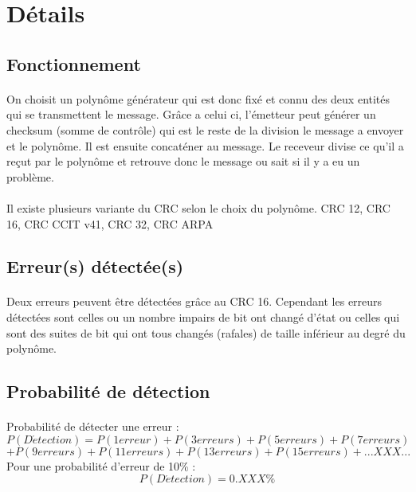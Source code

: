 \documentclass[a4paper,10pt]{report}
\begin{document}
            \section{Détails}
                \subsection{Fonctionnement}
                    \paragraph{}
                        On choisit un polynôme générateur qui est donc fixé et connu des deux entités qui se transmettent le message.
                        Grâce a celui ci, l'émetteur peut générer un checksum (somme de contrôle) qui est le reste
                        de la division le message a envoyer et le polynôme. Il est ensuite concaténer au message.
                        Le receveur divise ce qu'il a reçut par le polynôme et retrouve donc le message ou
                        sait si il y a eu un problème.
                    \paragraph{}
                        Il existe plusieurs variante du CRC selon le choix du polynôme.
                        CRC 12, CRC 16, CRC CCIT v41, CRC 32, CRC ARPA
                \subsection{Erreur(s) détectée(s)}
                    \paragraph{}
                        Deux erreurs peuvent être détectées grâce au CRC 16.
                        Cependant les erreurs détectées sont celles ou un nombre impairs de bit ont changé d'état ou
                        celles qui sont des suites de bit qui ont tous changés (rafales) de taille inférieur au
                        degré du polynôme.
                \subsection{Probabilité de détection}
                    \paragraph{}
                        Probabilité de détecter une erreur :
                        \[  P(D\acute{e}tection) = P(1 erreur) + P(3 erreurs) + P(5 erreurs) + P(7 erreurs) \]
                        \[  + P(9 erreurs) + P(11 erreurs) + P(13 erreurs) + P(15 erreurs) + ...XXX... \]
                        Pour une probabilité d'erreur de 10\% :
                        \[  P(D\acute{e}tection) =  0.XXX\% \]
\end{document}
